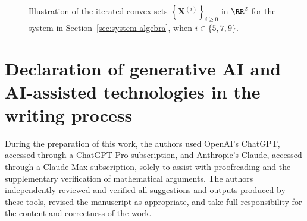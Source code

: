 \documentclass[10pt]{amsart}
\theoremstyle{plain}
\theoremstyle{definition}
\providecommand{\namedref}[2]{\hyperref[#2]{#1~\ref*{#2}}\xspace}
\providecommand{\sectionref}[1]{\namedref{Section}{sec:#1}}
\providecommand{\bX}[0]{\ensuremath{\mathbf X}\xspace}
\let\geq\geqslant
\providecommand{\p}[1]{\ensuremath{^{\left(#1\right)}}\xspace}
\begin{document}
\begin{figure}[htp]
\begin{tikzpicture}[scale=1.5, >=stealth]
    \end{tikzpicture}
    \caption{Illustration of the iterated convex sets $\left\{\bX\p i\right\}_{i\geq0}$ in $\RR^2$ %
    for the system in Section~\ref{sec:system-algebra}, when $i\in\{5,7,9\}$. 
    }
    \label{fig:itr}
\end{figure}




\section*{Declaration of generative AI and AI-assisted technologies in the writing process}

During the preparation of this work, the authors used OpenAI's ChatGPT, accessed through a ChatGPT Pro subscription, and Anthropic's Claude, accessed through a Claude Max subscription, solely to assist
with proofreading and the supplementary verification of mathematical arguments. 
The authors independently reviewed and verified all suggestions and outputs produced by these tools, revised the manuscript as appropriate, and take full responsibility for the content and correctness of the work.



\end{document}
